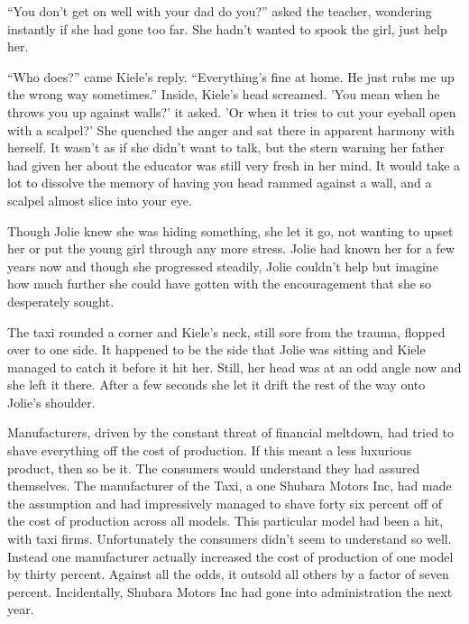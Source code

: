 ``You don't get on well with your dad do you?'' asked the teacher, wondering instantly if she had gone too far.  She hadn't wanted to spook the girl, just help her.

``Who does?'' came Kiele's reply.  ``Everything's fine at home.  He just rubs me up the wrong way sometimes.''  Inside, Kiele's head screamed.  'You mean when he throws you up against walls?' it asked.  'Or when it tries to cut your eyeball open with a scalpel?'  She quenched the anger and sat there in apparent harmony with herself.  It wasn't as if she didn't want to talk, but the stern warning her father had given her about the educator was still very fresh in her mind.  It would take a lot to dissolve the memory of having you head rammed against a wall, and a scalpel almost slice into your eye.

Though Jolie knew she was hiding something, she let it go, not wanting to upset her or put the young girl through any more stress.  Jolie had known her for a few years now and though she progressed steadily, Jolie couldn't help but imagine how much further she could have gotten with the encouragement that she so desperately sought.

The taxi rounded a corner and Kiele's neck, still sore from the trauma, flopped over to one side.  It happened to be the side that Jolie was sitting and Kiele managed to catch it before it hit her.  Still, her head was at an odd angle now and she left it there.  After a few seconds she let it drift the rest of the way onto Jolie's shoulder.  



\thoughtbreak



Manufacturers, driven by the constant threat of financial meltdown, had tried to shave everything off the cost of production.  If this meant a less luxurious product, then so be it.  The consumers would understand they had assured themselves.  The manufacturer of the Taxi, a one Shubara Motors Inc, had made the assumption and had impressively managed to shave forty six percent off of the cost of production across all models.  This particular model had been a hit, with taxi firms.  Unfortunately the consumers didn't seem to understand so well.  Instead one manufacturer actually increased the cost of production of one model by thirty percent.  Against all the odds, it outsold all others by a factor of seven percent.  Incidentally, Shubara Motors Inc had gone into administration the next year.




